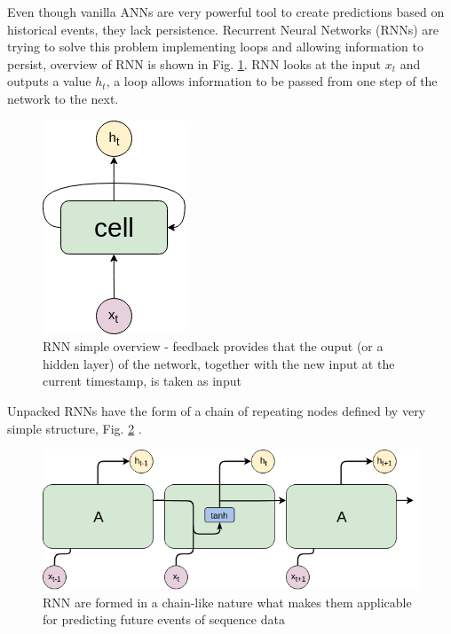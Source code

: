 \documentclass[11pt, a4paper]{article} %
\begin{document}
Even though vanilla ANNs are very powerful tool to create predictions based on historical events, they lack persistence. 
Recurrent Neural Networks (RNNs) are trying to solve this problem implementing loops and allowing information to persist, overview of RNN is shown in Fig. \ref{rnn}. RNN looks at the input $ x_{t} $ and outputs a value $ h_{t} $, a loop allows information to be passed from one step of the network to the next. 
\begin{figure}
	\centering
	\includegraphics[scale=.5]{images/RNN.png} %
	\caption{RNN simple overview - feedback provides that the ouput (or a hidden layer) of the network, together with the new input at the current timestamp, is taken as input}
	\label{rnn} 
\end{figure}
Unpacked RNNs have the form of a chain of repeating nodes defined by very simple structure, Fig. \ref{rnn-unpacked} \cite{Olah_lstm}.
\begin{figure}
	\centering
	\includegraphics[scale=.5]{images/RNN-unpacked.png} %
	\caption{RNN are formed in a chain-like nature what makes them applicable for predicting future events of sequence data}
	\label{rnn-unpacked} 
\end{figure}
\end{document}
